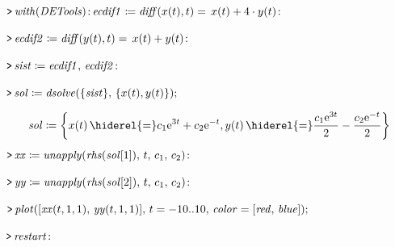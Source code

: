 \documentclass{article}
\begin{document}
\lstset{basicstyle=\ttfamily,breaklines=true,columns=flexible}
\pagestyle{empty}
\mapleinput
{$ \displaystyle \texttt{>\,} \mathit{with} (\mathit{DETools})\colon 
\\
 \,\mathit{ecdif1} \coloneqq \mathit{diff} (x (t),t)=\,x (t)+4\cdot y (t)\colon  $}

\mapleinput
{$ \displaystyle \texttt{>\,} \mathit{ecdif2} \coloneqq \mathit{diff} (y (t),t)=\,x (t)+y (t)\colon  $}

\mapleinput
{$ \displaystyle \texttt{>\,} \mathit{sist} \coloneqq \mathit{ecdif1} ,\,\mathit{ecdif2} \colon  $}

\mapleinput
{$ \displaystyle \texttt{>\,} \mathit{sol} \coloneqq \mathit{dsolve} (\{\mathit{sist} \},\,\{x (t),y (t)\}); $}

\begin{dmath}\label{(1)}
\mathit{sol} \coloneqq \left\{x \! \left(t \right) \hiderel{=} c_{1} {\mathrm e}^{3 t}+c_{2} {\mathrm e}^{-t},y \! \left(t \right) \hiderel{=} \frac{c_{1} {\mathrm e}^{3 t}}{2}-\frac{c_{2} {\mathrm e}^{-t}}{2}\right\}
\end{dmath}
\mapleinput
{$ \displaystyle \texttt{>\,} \mathit{xx} \coloneqq \mathit{unapply} (\mathit{rhs} (\mathit{sol} [1]),\,t ,\,c_{1},\,c_{2})\colon  $}

\mapleinput
{$ \displaystyle \texttt{>\,} \mathit{yy} \coloneqq \mathit{unapply} (\mathit{rhs} (\mathit{sol} [2]),\,t ,\,c_{1},\,c_{2})\colon  $}

\mapleinput
{$ \displaystyle \texttt{>\,} \mathit{plot} ([\mathit{xx} (t ,1,1),\,\mathit{yy} (t ,1,1)],\,t =-10..10,\,\mathit{color} =[\mathit{red} ,\,\mathit{blue}]); $}

{}
\mapleinput
{$ \displaystyle \texttt{>\,} \mathit{restart} \colon  $}
\end{document}
